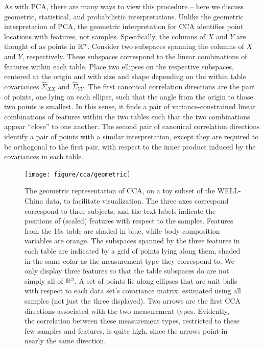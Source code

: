 \documentclass[14pt]{extarticle}
\begin{document}
As with PCA, there are many ways to view this procedure -- here we discuss
geometric, statistical, and probabilistic interpretations. Unlike the geometric
interpretation of PCA, the geometric interpretation for CCA identifies point
locations with features, not samples. Specifically, the columns of $X$ and $Y$
are thought of as points in $\mathbb{R}^{n}$. Consider two subspaces 
spanning the columns of $X$ and $Y$, respectively. These subspaces correspond to
the linear combinations of features within each table. Place two ellipses on the
respective subspaces, centered at the origin and with size and shape depending
on the within table covariances $\hat{\Sigma}_{XX}$ and $\hat{\Sigma}_{YY}$. The
first canonical correlation directions are the pair of points, one lying on each
ellipse, such that the angle from the origin to those two points is smallest. In
this sense, it finds a pair of variance-constrained linear combinations of
features within the two tables such that the two combinations appear ``close'' to
one another. The second pair of canonical correlation directions identify a pair
of points with a similar interpretation, except they are required to be orthogonal
to the first pair, with respect to the inner product induced by the covariances
in each table.

\begin{figure}
  \centering
  \texttt{[image: figure/cca/geometric]}
  \caption{The geometric representation of CCA, on a toy subset of the WELL-China
    data, to facilitate visualization. The three axes correspond correspond to
    three subjects, and the text labels indicate the positions of (scaled) features with
    respect to the samples. Features from the 16s table are shaded in blue,
    while body composition variables are orange. The subspaces spanned by the
    three features in each table are indicated by a grid of points lying along
    them, shaded in the same color as the measurement type they correspond to.
    We only display three features so that the table subspaces do are not simply
    all of $\mathbb{R}^{3}$. A set of points lie along ellipses that are unit balls
    with respect to each data set's covariance matrix, estimated using all
    samples (not just the three displayed). Two arrows are the first CCA
    directions associated with the two measurement types. Evidently, the
    correlation between these measurement types, restricted to these few samples
    and features, is quite high, since the arrows point in nearly the same
    direction.
    \label{fig:cca_geometric} }
\end{figure}
\end{document}
